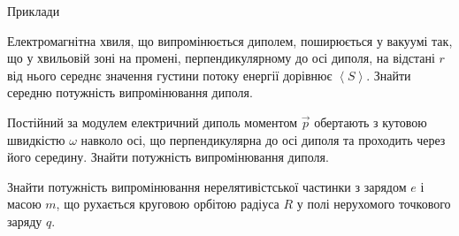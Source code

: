 \documentclass[9pt]{beamer}
\let\vect\vec
\begin{document}
\begin{frame}[t]{Приклади}{}
	\begin{overprint}\scriptsize
		\begin{block}{}\justifying
			Електромагнітна хвиля, що випромінюється диполем, поширюється у вакуумі так, що у хвильовій зоні на промені, перпендикулярному до осі диполя, на відстані $ r $ від нього середнє значення густини потоку енергії дорівнює $ \left\langle S \right\rangle $. Знайти середню потужність випромінювання диполя.
		\end{block}
		\begin{block}{}\justifying
			Постійний за модулем електричний диполь моментом $ \vect{p} $ обертають з кутовою швидкістю $ \omega $ навколо осі, що перпендикулярна до осі диполя та проходить через його середину. Знайти потужність випромінювання диполя.
		\end{block}
		\begin{block}{}\justifying
			Знайти потужність випромінювання нерелятивістської
			частинки з зарядом $ e $ і масою $ m $, що рухається круговою орбітою радіуса $ R $ у полі нерухомого точкового заряду $ q $.
		\end{block}
	\end{overprint}
\end{frame}
\end{document}
